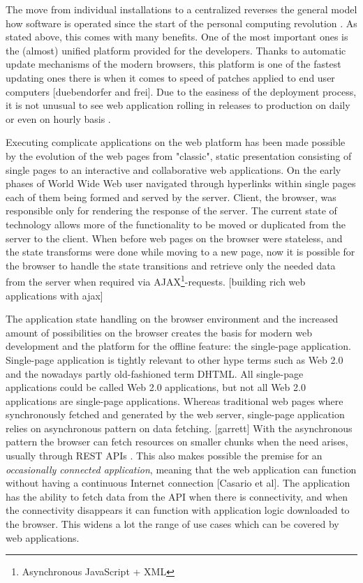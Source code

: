 The move from individual installations to a centralized reverses the general model how software is operated since the start of the personal computing revolution \cite[Chapter 3.3]{jazayeri_trends_????}. As stated above, this comes with many benefits. One of the most important ones is the (almost) unified platform provided for the developers. Thanks to automatic update mechanisms of the modern browsers, this platform is one of the fastest updating ones there is when it comes to speed of patches applied to end user computers [duebendorfer and frei]. Due to the easiness of the deployment process, it is not unusual to see web application rolling in releases to production on daily or even on hourly basis \cite[Chapter 3.3]{jazayeri_trends_????}.

Executing complicate applications on the web platform has been made possible by the evolution of the web pages from "classic", static presentation consisting of single pages to an interactive and collaborative web applications. On the early phases of World Wide Web user navigated through hyperlinks within single pages each of them being formed and served by the server. Client, the browser, was responsible only for rendering the response of the server. \cite{taivalsaari_mashware:_2009} The current state of technology allows more of the functionality to be moved or duplicated from the server to the client. When before web pages on the browser were stateless, and the state transforms were done while moving to a new page, now it is possible for the browser to handle the state transitions and retrieve only the needed data from the server when required via AJAX\footnote{Asynchronous JavaScript + XML}-requests. [building rich web applications with ajax] 

The application state handling on the browser environment and the increased amount of possibilities on the browser creates the basis for modern web development and the platform for the offline feature: the single-page application. Single-page application is tightly relevant to other hype terms such as Web 2.0 and the nowadays partly old-fashioned term DHTML. All single-page applications could be called Web 2.0 applications, but not all Web 2.0 applications are single-page applications. Whereas traditional web pages where synchronously fetched and generated by the web server, single-page application relies on asynchronous pattern on data fetching. [garrett] With the asynchronous pattern the browser can fetch resources on smaller chunks when the need arises, usually through REST APIs \cite{masse_rest_2011}. This also makes possible the premise for an \textit{occasionally connected application}, meaning that the web application can function without having a continuous Internet connection [Casario et al]. The application has the ability to fetch data from the API when there is connectivity, and when the connectivity disappears it can function with application logic downloaded to the browser.  This widens a lot the range of use cases which can be covered by web applications.



